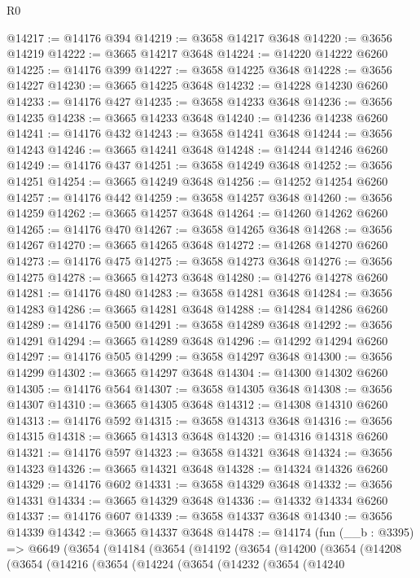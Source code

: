 \begin{lexlean}{R0}
\begin{coremodule}
@14217 := @14176 @394
@14219 := @3658 @14217 @3648
@14220 := @3656 @14219
@14222 := @3665 @14217 @3648
@14224 := @14220 @14222 @6260
@14225 := @14176 @399
@14227 := @3658 @14225 @3648
@14228 := @3656 @14227
@14230 := @3665 @14225 @3648
@14232 := @14228 @14230 @6260
@14233 := @14176 @427
@14235 := @3658 @14233 @3648
@14236 := @3656 @14235
@14238 := @3665 @14233 @3648
@14240 := @14236 @14238 @6260
@14241 := @14176 @432
@14243 := @3658 @14241 @3648
@14244 := @3656 @14243
@14246 := @3665 @14241 @3648
@14248 := @14244 @14246 @6260
@14249 := @14176 @437
@14251 := @3658 @14249 @3648
@14252 := @3656 @14251
@14254 := @3665 @14249 @3648
@14256 := @14252 @14254 @6260
@14257 := @14176 @442
@14259 := @3658 @14257 @3648
@14260 := @3656 @14259
@14262 := @3665 @14257 @3648
@14264 := @14260 @14262 @6260
@14265 := @14176 @470
@14267 := @3658 @14265 @3648
@14268 := @3656 @14267
@14270 := @3665 @14265 @3648
@14272 := @14268 @14270 @6260
@14273 := @14176 @475
@14275 := @3658 @14273 @3648
@14276 := @3656 @14275
@14278 := @3665 @14273 @3648
@14280 := @14276 @14278 @6260
@14281 := @14176 @480
@14283 := @3658 @14281 @3648
@14284 := @3656 @14283
@14286 := @3665 @14281 @3648
@14288 := @14284 @14286 @6260
@14289 := @14176 @500
@14291 := @3658 @14289 @3648
@14292 := @3656 @14291
@14294 := @3665 @14289 @3648
@14296 := @14292 @14294 @6260
@14297 := @14176 @505
@14299 := @3658 @14297 @3648
@14300 := @3656 @14299
@14302 := @3665 @14297 @3648
@14304 := @14300 @14302 @6260
@14305 := @14176 @564
@14307 := @3658 @14305 @3648
@14308 := @3656 @14307
@14310 := @3665 @14305 @3648
@14312 := @14308 @14310 @6260
@14313 := @14176 @592
@14315 := @3658 @14313 @3648
@14316 := @3656 @14315
@14318 := @3665 @14313 @3648
@14320 := @14316 @14318 @6260
@14321 := @14176 @597
@14323 := @3658 @14321 @3648
@14324 := @3656 @14323
@14326 := @3665 @14321 @3648
@14328 := @14324 @14326 @6260
@14329 := @14176 @602
@14331 := @3658 @14329 @3648
@14332 := @3656 @14331
@14334 := @3665 @14329 @3648
@14336 := @14332 @14334 @6260
@14337 := @14176 @607
@14339 := @3658 @14337 @3648
@14340 := @3656 @14339
@14342 := @3665 @14337 @3648
@14478 := @14174
    (fun (__b : @3395) =>
    @6649
      (@3654
        (@14184
          (@3654
            (@14192
              (@3654
                (@14200
                  (@3654
                    (@14208
                      (@3654
                        (@14216
                          (@3654
                            (@14224
                              (@3654
                                (@14232
                                  (@3654
                                    (@14240

\end{coremodule}
\end{lexlean}
